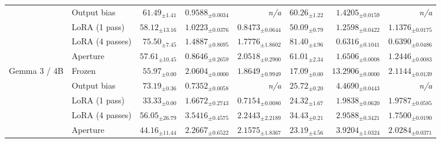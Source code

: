 \begin{tabular}{@{}llrrrrrr@{}}
 & Output bias & $61.49_{\pm 1.41}$ & $0.9588_{\pm 0.0034}$ & \textit{n/a} & $60.26_{\pm 1.22}$ & $1.4205_{\pm 0.0159}$ & \textit{n/a} \\
 & LoRA (1 pass) & $58.12_{\pm 13.16}$ & $1.0223_{\pm 0.0376}$ & $\mathbf{0.8473}_{\pm 0.0644}$ & $50.09_{\pm 0.79}$ & $1.2598_{\pm 0.0422}$ & $1.1376_{\pm 0.0175}$ \\
 & LoRA (4 passes) & $\mathbf{75.50}_{\pm 7.45}$ & $1.4887_{\pm 0.8695}$ & $1.7776_{\pm 1.8602}$ & $\mathbf{81.40}_{\pm 4.96}$ & $\mathbf{0.6316}_{\pm 0.1041}$ & $\mathbf{0.6390}_{\pm 0.0486}$ \\
 & Aperture & $57.61_{\pm 10.45}$ & $\mathbf{0.8646}_{\pm 0.2659}$ & $2.0518_{\pm 0.2900}$ & $61.01_{\pm 2.34}$ & $1.6506_{\pm 0.0008}$ & $1.2446_{\pm 0.0083}$ \\
\midrule
Gemma 3 / 4B & Frozen & $55.97_{\pm 0.00}$ & $2.0604_{\pm 0.0000}$ & $1.8649_{\pm 0.9949}$ & $17.09_{\pm 0.00}$ & $13.2906_{\pm 0.0000}$ & $2.1144_{\pm 0.0139}$ \\
 & Output bias & $\mathbf{73.19}_{\pm 0.36}$ & $\mathbf{0.7352}_{\pm 0.0058}$ & \textit{n/a} & $25.72_{\pm 0.20}$ & $4.4690_{\pm 0.0443}$ & \textit{n/a} \\
 & LoRA (1 pass) & $33.33_{\pm 0.00}$ & $1.6672_{\pm 0.2743}$ & $\mathbf{0.7154}_{\pm 0.0080}$ & $24.32_{\pm 1.67}$ & $\mathbf{1.9838}_{\pm 0.0620}$ & $1.9787_{\pm 0.0585}$ \\
 & LoRA (4 passes) & $56.05_{\pm 26.79}$ & $3.5416_{\pm 0.4575}$ & $2.2443_{\pm 2.2189}$ & $\mathbf{34.43}_{\pm 0.21}$ & $2.9588_{\pm 0.3421}$ & $\mathbf{1.7500}_{\pm 0.0190}$ \\
 & Aperture & $44.16_{\pm 11.44}$ & $2.2667_{\pm 0.6522}$ & $2.1575_{\pm 1.8367}$ & $23.19_{\pm 4.56}$ & $3.9204_{\pm 1.0324}$ & $2.0284_{\pm 0.0371}$ \\
\bottomrule\end{tabular}
